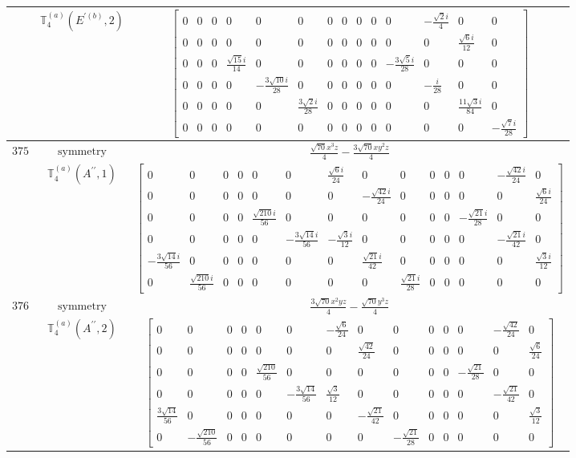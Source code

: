 \documentclass[fleqn,8pt,landscape]{jsarticle}
\begin{document}
\begin{longtable}{ccc}
$  $ & $ \mathbb{T}_{4}^{(a)}(E^{\prime(b)},2) $ & $ \begin{bmatrix} 0 & 0 & 0 & 0 & 0 & 0 & 0 & 0 & 0 & 0 & 0 & - \frac{\sqrt{2} i}{4} & 0 & 0 \\ 0 & 0 & 0 & 0 & 0 & 0 & 0 & 0 & 0 & 0 & 0 & 0 & \frac{\sqrt{6} i}{12} & 0 \\ 0 & 0 & 0 & \frac{\sqrt{15} i}{14} & 0 & 0 & 0 & 0 & 0 & 0 & - \frac{3 \sqrt{5} i}{28} & 0 & 0 & 0 \\ 0 & 0 & 0 & 0 & - \frac{3 \sqrt{10} i}{28} & 0 & 0 & 0 & 0 & 0 & 0 & - \frac{i}{28} & 0 & 0 \\ 0 & 0 & 0 & 0 & 0 & \frac{3 \sqrt{2} i}{28} & 0 & 0 & 0 & 0 & 0 & 0 & \frac{11 \sqrt{3} i}{84} & 0 \\ 0 & 0 & 0 & 0 & 0 & 0 & 0 & 0 & 0 & 0 & 0 & 0 & 0 & - \frac{\sqrt{7} i}{28} \end{bmatrix} $ \\ \hline
$ 375 $ & $ \text{symmetry} $ & $ \frac{\sqrt{70} x^{3} z}{4} - \frac{3 \sqrt{70} x y^{2} z}{4} $ \\
$  $ & $ \mathbb{T}_{4}^{(a)}(A^{\prime\prime},1) $ & $ \begin{bmatrix} 0 & 0 & 0 & 0 & 0 & 0 & \frac{\sqrt{6} i}{24} & 0 & 0 & 0 & 0 & 0 & - \frac{\sqrt{42} i}{24} & 0 \\ 0 & 0 & 0 & 0 & 0 & 0 & 0 & - \frac{\sqrt{42} i}{24} & 0 & 0 & 0 & 0 & 0 & \frac{\sqrt{6} i}{24} \\ 0 & 0 & 0 & 0 & \frac{\sqrt{210} i}{56} & 0 & 0 & 0 & 0 & 0 & 0 & - \frac{\sqrt{21} i}{28} & 0 & 0 \\ 0 & 0 & 0 & 0 & 0 & - \frac{3 \sqrt{14} i}{56} & - \frac{\sqrt{3} i}{12} & 0 & 0 & 0 & 0 & 0 & - \frac{\sqrt{21} i}{42} & 0 \\ - \frac{3 \sqrt{14} i}{56} & 0 & 0 & 0 & 0 & 0 & 0 & \frac{\sqrt{21} i}{42} & 0 & 0 & 0 & 0 & 0 & \frac{\sqrt{3} i}{12} \\ 0 & \frac{\sqrt{210} i}{56} & 0 & 0 & 0 & 0 & 0 & 0 & \frac{\sqrt{21} i}{28} & 0 & 0 & 0 & 0 & 0 \end{bmatrix} $ \\ \hline
$ 376 $ & $ \text{symmetry} $ & $ \frac{3 \sqrt{70} x^{2} y z}{4} - \frac{\sqrt{70} y^{3} z}{4} $ \\
$  $ & $ \mathbb{T}_{4}^{(a)}(A^{\prime\prime},2) $ & $ \begin{bmatrix} 0 & 0 & 0 & 0 & 0 & 0 & - \frac{\sqrt{6}}{24} & 0 & 0 & 0 & 0 & 0 & - \frac{\sqrt{42}}{24} & 0 \\ 0 & 0 & 0 & 0 & 0 & 0 & 0 & \frac{\sqrt{42}}{24} & 0 & 0 & 0 & 0 & 0 & \frac{\sqrt{6}}{24} \\ 0 & 0 & 0 & 0 & \frac{\sqrt{210}}{56} & 0 & 0 & 0 & 0 & 0 & 0 & - \frac{\sqrt{21}}{28} & 0 & 0 \\ 0 & 0 & 0 & 0 & 0 & - \frac{3 \sqrt{14}}{56} & \frac{\sqrt{3}}{12} & 0 & 0 & 0 & 0 & 0 & - \frac{\sqrt{21}}{42} & 0 \\ \frac{3 \sqrt{14}}{56} & 0 & 0 & 0 & 0 & 0 & 0 & - \frac{\sqrt{21}}{42} & 0 & 0 & 0 & 0 & 0 & \frac{\sqrt{3}}{12} \\ 0 & - \frac{\sqrt{210}}{56} & 0 & 0 & 0 & 0 & 0 & 0 & - \frac{\sqrt{21}}{28} & 0 & 0 & 0 & 0 & 0 \end{bmatrix} $ \\ \hline

\end{longtable}
\end{document}
